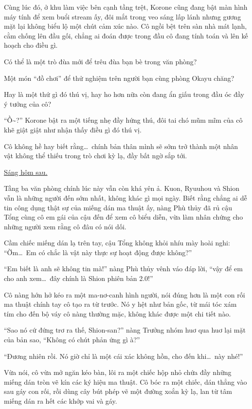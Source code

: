 \documentclass[../main.tex]{subfiles}
\begin{document}
Cùng lúc đó, ở khu làm việc bên cạnh tầng trệt, Korone cũng đang bật màn hình máy tính để xem buổi stream ấy, đôi mắt trong veo sáng lấp lánh nhưng gương mặt lại không biểu lộ một chút cảm xúc nào. Cô ngồi bệt trên sàn nhà mát lạnh, cằm chống lên đầu gối, chẳng ai đoán được trong đầu cô đang tính toán và lên kế hoạch cho điều gì.


Có thể là một trò đùa mới để trêu đùa bạn bè trong văn phòng?

Một món ``đồ chơi'' để thử nghiệm trên người bạn cùng phòng Okayu chăng?

Hay là một thứ gì đó thú vị, hay ho hơn nữa còn đang ẩn giấu trong đầu óc đầy ý tưởng của cô?

``Ồ\~{}?'' Korone bật ra một tiếng nhẹ đầy hứng thú, đôi tai chó mũm mĩm của cô khẽ giật giật như nhận thấy điều gì đó thú vị.

Cô không hề hay biết rằng\dots\ chính bản thân mình sẽ sớm trở thành một nhân vật không thể thiếu trong trò chơi kỳ lạ, đầy bất ngờ sắp tới.

\begin{center}
  \uline{Sáng hôm sau.}
\end{center}

Tầng ba văn phòng chính lúc này vẫn còn khá yên ả. Kuon, Ryuuhou và Shion vẫn là những người đến sớm nhất, không khác gì mọi ngày. Biết rằng chẳng ai dễ tin công dụng thật sự của miếng dán ma thuật ấy, nàng Phù thủy đã rủ cậu Tổng cùng cô em gái của cậu đến để xem cô biểu diễn, vừa làm nhân chứng cho những người xem rằng cô đâu có nói dối.

Cầm chiếc miếng dán lạ trên tay, cậu Tổng không khỏi nhíu mày hoài nghi: ``Ờm\dots\ Em có chắc là vật này thực sự hoạt động được không?''

``Em biết là anh sẽ không tin mà!'' nàng Phù thủy vênh váo đáp lời, ``vậy để em cho anh xem\dots\ đây chính là Shion phiên bản 2.0!''

Cô nàng hớn hở kéo ra một ma-nơ-canh hình người, nói đúng hơn là một con rối ma thuật chính tay cô tạo ra từ trước. Nó y hệt như bản gốc, từ mái tóc xám tím cho đến bộ váy cô nàng thường mặc, không khác được một chi tiết nào.

``Sao nó cứ đứng trơ ra thế, Shion-san?'' nàng Trưởng nhóm huơ qua huơ lại mặt của bản sao, ``Không có chút phản ứng gì à?''

``Đương nhiên rồi. Nó giờ chỉ là một cái xác không hồn, cho đến khi\dots\ này nhé!''

Vừa nói, cô vừa mở ngăn kéo bàn, lôi ra một chiếc hộp nhỏ chứa đầy những miếng dán tròn vẽ kín các ký hiệu ma thuật. Cô bóc ra một chiếc, dán thẳng vào sau gáy con rối, rồi dùng cây bút phép vẽ một đường xoắn kỳ lạ, lan từ tâm miếng dán ra hết các khớp vai và gáy.
\end{document}
